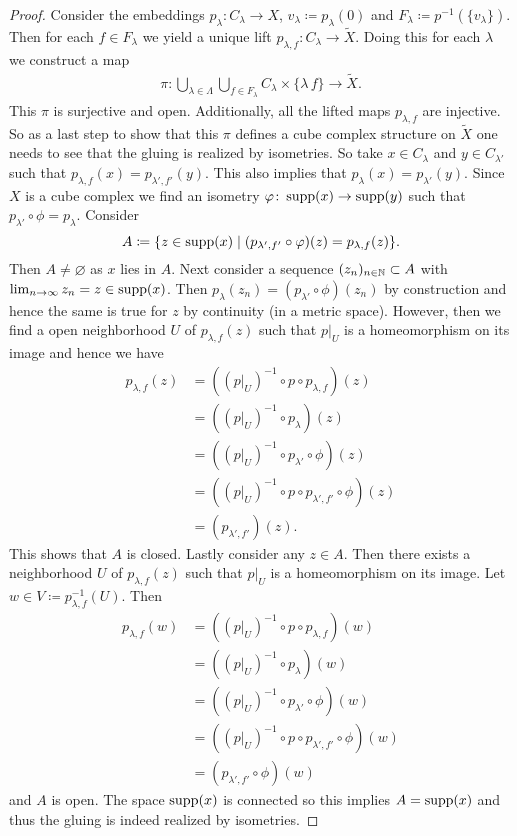 \begin{proof}
  Consider the embeddings \(p_\lambda\colon C_\lambda \to X\), \(v_\lambda \coloneqq p_\lambda(0)\) and \(F_\lambda \coloneqq p^{-1}(\{v_\lambda\})\). Then for each \(f \in F_\lambda\) we yield a unique lift \(p_{\lambda, f}\colon C_\lambda \to \tilde X\).
  Doing this for each \(\lambda\) we construct a map
  \begin{align*}
    \pi \colon \bigcup_{\lambda \in \Lambda} \bigcup_{f \in F_{\lambda}} C_\lambda \times \{\lambda\, f\} \to \tilde X.
  \end{align*}
  This \(\pi\) is surjective and open. Additionally, all the lifted maps \(p_{\lambda, f}\) are injective. So as a last step to show that this \(\pi\) defines a cube complex structure on \(\tilde X\) one needs to see that the gluing is realized by isometries. So take \(x \in C_\lambda\) and \(y \in C_{\lambda'}\) such that \(p_{\lambda,f}(x) = p_{\lambda', f'}(y)\). This also implies that \(p_\lambda(x) = p_{\lambda'}(y)\). Since \(X\) is a cube complex we find an isometry \(\varphi\colon \operatorname{supp}(x) \to \operatorname{supp}(y)\) such that \(p_{\lambda'} \circ \phi  = p_\lambda\). Consider
  \[
    A \coloneqq \{z \in \operatorname{supp}(x) \mid (p_{\lambda', f'} \circ \varphi)(z) = p_{\lambda, f}(z)\}.
  \]
  Then \(A \neq \varnothing\) as \(x\) lies in \(A\). Next consider a sequence \((z_n)_{n \in \mathbb{N}} \subset A\) with \(\lim_{n \to \infty} z_n = z \in \operatorname{supp}(x)\). Then \(p_\lambda(z_n) = (p_{\lambda'} \circ \phi)(z_n)\) by construction and hence the same is true for \(z\) by continuity (in a metric space). However, then we find a open neighborhood \(U\) of \(p_{\lambda,f}(z)\) such that \(p|_U\) is a homeomorphism on its image and hence we have
  \begin{align*}
    p_{\lambda,f}(z)
    & = ((p|_U)^{-1} \circ p \circ p_{\lambda,f})(z)\\
    & = ((p|_U)^{-1} \circ p_\lambda)(z)\\
    & = ((p|_U)^{-1} \circ p_{\lambda'} \circ \phi)(z)\\
    & = ((p|_U)^{-1} \circ p \circ p_{\lambda',f'} \circ \phi)(z)\\
    & = (p_{\lambda', f'} )(z).
  \end{align*}
  This shows that \(A\) is closed. Lastly consider any \(z \in A\). Then there exists a neighborhood \(U\) of \(p_{\lambda, f}(z)\) such that \(p|_U\) is a homeomorphism on its image. Let \(w \in V \coloneqq p_{\lambda, f}^{-1}(U)\). Then
  \begin{align*}
    p_{\lambda,f}(w)
    & = ((p|_U)^{-1} \circ p \circ p_{\lambda,f})(w)\\
    & = ((p|_U)^{-1} \circ p_\lambda)(w)\\
    & = ((p|_U)^{-1} \circ p_{\lambda'} \circ \phi)(w)\\
    & = ((p|_U)^{-1} \circ p \circ p_{\lambda', f'} \circ \phi)(w)\\
    & = (p_{\lambda', f'} \circ \phi)(w)
  \end{align*}
  and \(A\) is open. The space \(\operatorname{supp}(x)\) is connected so this implies \(A = \operatorname{supp}(x)\) and thus the gluing is indeed realized by isometries.


\end{proof}
